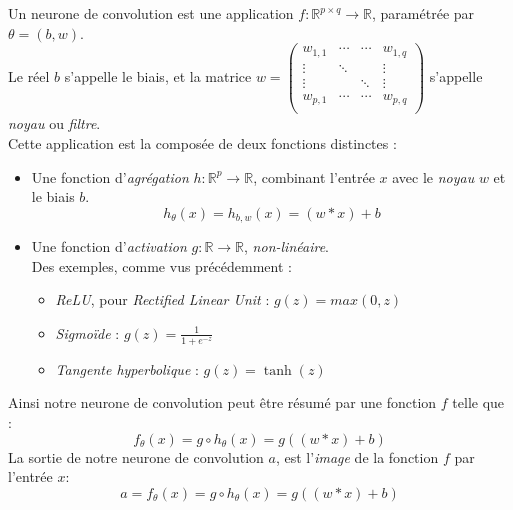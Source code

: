 \documentclass[10pt,a4paper]{report}
\begin{document}
			Un neurone de convolution est une application $f : \mathbb{R}^{p \times q} \rightarrow \mathbb{R}$, paramétrée par $\theta = (b,w)$.\\
			Le réel $b$ s'appelle le biais, et la matrice $w = \begin{pmatrix}
			w_{1,1} & \cdots & \cdots & w_{1,q} \\ 
			\vdots & \ddots &  & \vdots \\ 
			\vdots &  & \ddots & \vdots \\ 
			w_{p,1} & \cdots & \cdots & w_{p,q}\\
			\end{pmatrix}  $ s'appelle \emph{noyau} ou \emph{filtre}.\\
			Cette application est la composée de deux fonctions distinctes :
			\begin{itemize}
				\item Une fonction d’\emph{agrégation} $h : \mathbb{R}^p \rightarrow \mathbb{R}$, combinant l'entrée $x$ avec le \emph{noyau} $w$ et le biais $b$.\\
				$$h_\theta(x) = h_{b,w}(x) = (w * x) + b$$
				\item Une fonction d'\emph{activation} $g : \mathbb{R} \rightarrow \mathbb{R}$, \emph{non-linéaire}.\\
				Des exemples, comme vus précédemment :
				\begin{itemize}
					\item \emph{ReLU}, pour \emph{Rectified Linear Unit} : $g(z) = max(0,z)$
					\item \emph{Sigmoïde} : $g(z) = \frac{1}{1+e^{-z}}$
					\item \emph{Tangente hyperbolique} : $g(z) = \tanh(z)$
				\end{itemize}
			\end{itemize}
		Ainsi notre neurone de convolution peut être résumé par une fonction $f$ telle que :
		$$f_\theta(x) = g \circ h_\theta(x) = g((w * x) + b)$$
		La sortie de notre neurone de convolution $a$, est l'\emph{image} de la fonction $f$ par l'entrée $x$:
		$$a = f_\theta(x) = g \circ h_\theta(x) = g((w * x) + b)$$
\end{document}
